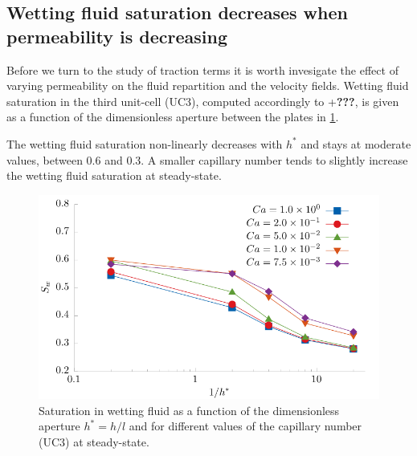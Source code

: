 \documentclass[]{article}
\begin{document}
\hypertarget{wetting-fluid-saturation-decreases-when-permeability-is-decreasing}{%
\subsection{Wetting fluid saturation decreases when permeability is
decreasing}\label{wetting-fluid-saturation-decreases-when-permeability-is-decreasing}}

Before we turn to the study of traction terms it is worth invesigate the
effect of varying permeability on the fluid repartition and the velocity
fields. Wetting fluid saturation in the third unit-cell (UC3), computed
accordingly to +\textbf{???}, is given as a function of the
dimensionless aperture between the plates in \cref{fig:saturation}.

The wetting fluid saturation non-linearly decreases with \(h^*\) and
stays at moderate values, between 0.6 and 0.3. A smaller capillary
number tends to slightly increase the wetting fluid saturation at
steady-state.

\begin{figure}
\hypertarget{fig:saturation}{%
\centering
\includegraphics{figures/pdf/saturation.pdf}
\caption{Saturation in wetting fluid as a function of the dimensionless
aperture \(h^{*}=h/l\) and for different values of the capillary number
(UC3) at steady-state.}\label{fig:saturation}
}
\end{figure}
\end{document}
